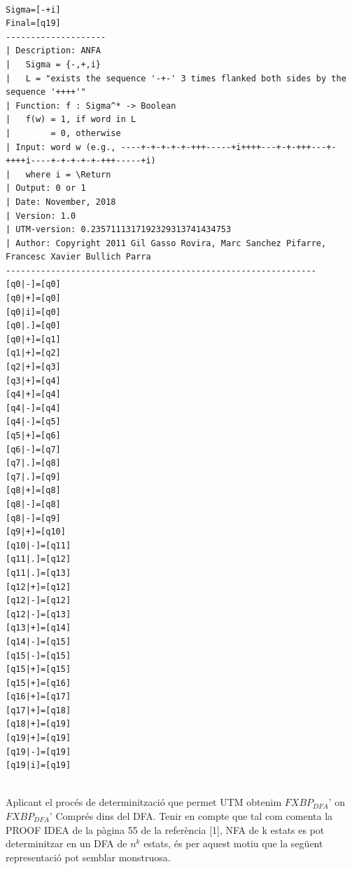 \documentclass[12pt,a4paper]{report}
\def \dfa{$FXBP_{DFA} $}
\begin{document}
\begin{lstlisting}

Sigma=[-+i]
Final=[q19]
--------------------
| Description: ANFA
|   Sigma = {-,+,i}
|   L = "exists the sequence '-+-' 3 times flanked both sides by the sequence '++++'"
| Function: f : Sigma^* -> Boolean
|   f(w) = 1, if word in L
|        = 0, otherwise
| Input: word w (e.g., ----+-+-+-+-+-+++-----+i++++---+-+-+++---+-++++i----+-+-+-+-+-+++-----+i)
|   where i = \Return
| Output: 0 or 1
| Date: November, 2018
| Version: 1.0
| UTM-version: 0.2357111317192329313741434753
| Author: Copyright 2011 Gil Gasso Rovira, Marc Sanchez Pifarre, Francesc Xavier Bullich Parra
--------------------------------------------------------------
[q0|-]=[q0]
[q0|+]=[q0]
[q0|i]=[q0]
[q0|.]=[q0]
[q0|+]=[q1]
[q1|+]=[q2]
[q2|+]=[q3]
[q3|+]=[q4]
[q4|+]=[q4]
[q4|-]=[q4]
[q4|-]=[q5]
[q5|+]=[q6]
[q6|-]=[q7]
[q7|.]=[q8]
[q7|.]=[q9]
[q8|+]=[q8]
[q8|-]=[q8]
[q8|-]=[q9]
[q9|+]=[q10]
[q10|-]=[q11]
[q11|.]=[q12]
[q11|.]=[q13]
[q12|+]=[q12]
[q12|-]=[q12]
[q12|-]=[q13]
[q13|+]=[q14]
[q14|-]=[q15]
[q15|-]=[q15]
[q15|+]=[q15]
[q15|+]=[q16]
[q16|+]=[q17]
[q17|+]=[q18]
[q18|+]=[q19]
[q19|+]=[q19]
[q19|-]=[q19]
[q19|i]=[q19]


\end{lstlisting}

Aplicant el procés de determinització que permet UTM obtenim \dfa' on \dfa' Comprés dins del DFA. Tenir en compte que tal com comenta la PROOF IDEA de la pàgina 55 de la referència [1], NFA de k estats es pot determinitzar en un DFA de $n^k$ estats, és per aquest motiu que la següent representació pot semblar monstruosa. 
\end{document}
